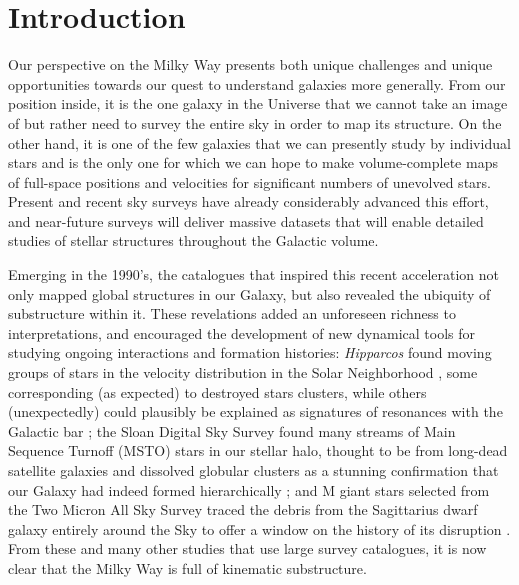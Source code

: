 \documentclass[galaxies,article,submit,moreauthors,pdftex,10pt,a4paper]{mdpi}
\newcommand{\survey}[1]{\textsl{#1}}
\begin{document}


\section{Introduction}

Our perspective on the Milky Way presents both unique challenges and unique opportunities towards our quest to understand galaxies more generally.
From our position inside, it is the one galaxy in the Universe that we cannot take an image of but rather need to survey the entire sky in order to map its structure.
On the other hand, it is one of the few galaxies that we can presently study by individual stars and is the only one for which we can hope to make volume-complete maps of full-space positions and velocities for significant numbers of unevolved stars.
Present and recent sky surveys have already considerably advanced this effort, and near-future surveys will deliver massive datasets that will enable detailed studies of stellar structures throughout the Galactic volume.


Emerging in the 1990's, the catalogues that inspired this recent acceleration not only mapped global structures in our Galaxy, but also revealed the ubiquity of substructure within it.
These revelations added an unforeseen richness to interpretations, and encouraged the development of new dynamical tools for studying ongoing interactions and formation histories:
\survey{Hipparcos} \citep{esa97} found moving groups of stars in the velocity distribution in the Solar Neighborhood \citep{dehnen98}, some corresponding (as expected) to destroyed stars clusters, while others (unexpectedly) could plausibly be explained as signatures of resonances with the Galactic bar \citep{dehnen00};
the Sloan Digital Sky Survey \citep[hereafter, SDSS ---][]{york00,stoughton02,abazajian03} found many streams of Main Sequence Turnoff (MSTO) stars in our stellar halo, thought to be from long-dead satellite galaxies and dissolved globular clusters \citep{newberg02,belokurov06} as a stunning confirmation that our Galaxy had indeed formed hierarchically \citep[e.g.][]{bullock01,bullock05};
and M giant stars selected from the Two Micron All Sky Survey \citep[hereafter, 2MASS ---][]{nikolaev00} traced the debris from the Sagittarius dwarf galaxy entirely around the Sky \citep{majewski03} to offer a window on the history of its disruption \citep{law10}.
From these and many other studies that use large survey catalogues, it is now clear that the Milky Way is full of kinematic substructure.
\end{document}
